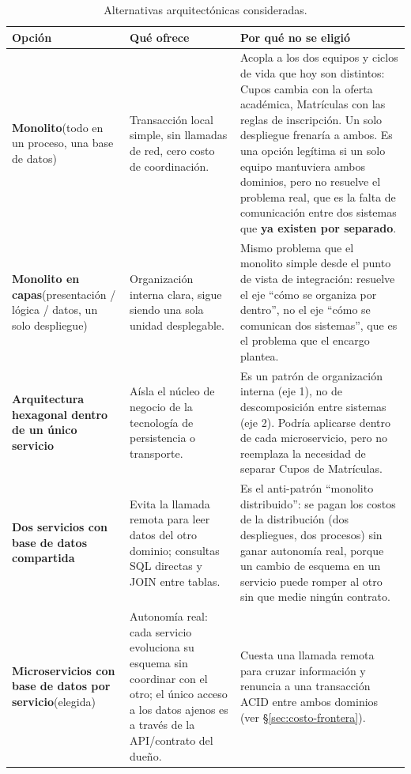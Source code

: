 \documentclass[11pt,spanish]{article}
\begin{document}
\begin{table}[H]
\centering
\small
\begin{tabularx}{\textwidth}{p{3.6cm} X X}
\toprule
\textbf{Opción} & \textbf{Qué ofrece} & \textbf{Por qué no se eligió} \\
\midrule
\textbf{Monolito}\newline (todo en un proceso, una base de datos) & Transacción local simple, sin llamadas de red, cero costo de coordinación. & Acopla a los dos equipos y ciclos de vida que hoy son distintos: Cupos cambia con la oferta académica, Matrículas con las reglas de inscripción. Un solo despliegue frenaría a ambos. Es una opción legítima si un solo equipo mantuviera ambos dominios, pero no resuelve el problema real, que es la falta de comunicación entre dos sistemas que \textbf{ya existen por separado}. \\
\addlinespace
\textbf{Monolito en capas}\newline (presentación / lógica / datos, un solo despliegue) & Organización interna clara, sigue siendo una sola unidad desplegable. & Mismo problema que el monolito simple desde el punto de vista de integración: resuelve el eje ``cómo se organiza por dentro'', no el eje ``cómo se comunican dos sistemas'', que es el problema que el encargo plantea. \\
\addlinespace
\textbf{Arquitectura hexagonal dentro de un único servicio} & Aísla el núcleo de negocio de la tecnología de persistencia o transporte. & Es un patrón de organización interna (eje 1), no de descomposición entre sistemas (eje 2). Podría aplicarse dentro de cada microservicio, pero no reemplaza la necesidad de separar Cupos de Matrículas. \\
\addlinespace
\textbf{Dos servicios con base de datos compartida} & Evita la llamada remota para leer datos del otro dominio; consultas SQL directas y JOIN entre tablas. & Es el anti-patrón ``monolito distribuido'': se pagan los costos de la distribución (dos despliegues, dos procesos) sin ganar autonomía real, porque un cambio de esquema en un servicio puede romper al otro sin que medie ningún contrato. \\
\addlinespace
\textbf{Microservicios con base de datos por servicio}\newline (elegida) & Autonomía real: cada servicio evoluciona su esquema sin coordinar con el otro; el único acceso a los datos ajenos es a través de la API/contrato del dueño. & Cuesta una llamada remota para cruzar información y renuncia a una transacción ACID entre ambos dominios (ver \S\ref{sec:costo-frontera}). \\
\bottomrule
\end{tabularx}
\caption{Alternativas arquitectónicas consideradas.}
\end{table}
\end{document}
